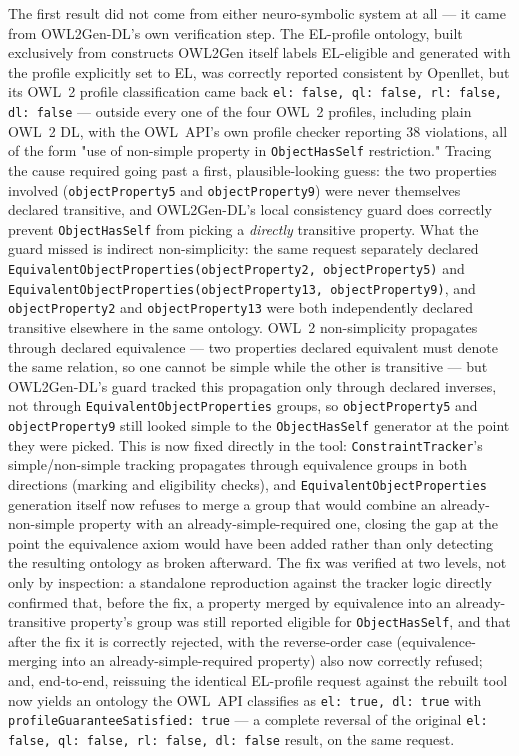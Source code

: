The first result did not come from either neuro-symbolic system at all — it came from OWL2Gen-DL's own verification step. The EL-profile ontology, built exclusively from constructs OWL2Gen itself labels EL-eligible and generated with the profile explicitly set to EL, was correctly reported consistent by Openllet, but its OWL~2 profile classification came back \texttt{el: false, ql: false, rl: false, dl: false} — outside every one of the four OWL~2 profiles, including plain OWL~2 DL, with the OWL~API's own profile checker reporting 38 violations, all of the form "use of non-simple property in \texttt{ObjectHasSelf} restriction." Tracing the cause required going past a first, plausible-looking guess: the two properties involved (\texttt{objectProperty5} and \texttt{objectProperty9}) were never themselves declared transitive, and OWL2Gen-DL's local consistency guard does correctly prevent \texttt{ObjectHasSelf} from picking a \emph{directly} transitive property. What the guard missed is indirect non-simplicity: the same request separately declared \texttt{EquivalentObjectProperties(objectProperty2, objectProperty5)} and \texttt{EquivalentObjectProperties(objectProperty13, objectProperty9)}, and \texttt{objectProperty2} and \texttt{objectProperty13} were both independently declared transitive elsewhere in the same ontology. OWL~2 non-simplicity propagates through declared equivalence — two properties declared equivalent must denote the same relation, so one cannot be simple while the other is transitive — but OWL2Gen-DL's guard tracked this propagation only through declared inverses, not through \texttt{EquivalentObjectProperties} groups, so \texttt{objectProperty5} and \texttt{objectProperty9} still looked simple to the \texttt{ObjectHasSelf} generator at the point they were picked. This is now fixed directly in the tool: \texttt{ConstraintTracker}'s simple/non-simple tracking propagates through equivalence groups in both directions (marking and eligibility checks), and \texttt{EquivalentObjectProperties} generation itself now refuses to merge a group that would combine an already-non-simple property with an already-simple-required one, closing the gap at the point the equivalence axiom would have been added rather than only detecting the resulting ontology as broken afterward. The fix was verified at two levels, not only by inspection: a standalone reproduction against the tracker logic directly confirmed that, before the fix, a property merged by equivalence into an already-transitive property's group was still reported eligible for \texttt{ObjectHasSelf}, and that after the fix it is correctly rejected, with the reverse-order case (equivalence-merging into an already-simple-required property) also now correctly refused; and, end-to-end, reissuing the identical EL-profile request against the rebuilt tool now yields an ontology the OWL~API classifies as \texttt{el: true, dl: true} with \texttt{profileGuaranteeSatisfied: true} — a complete reversal of the original \texttt{el: false, ql: false, rl: false, dl: false} result, on the same request.

